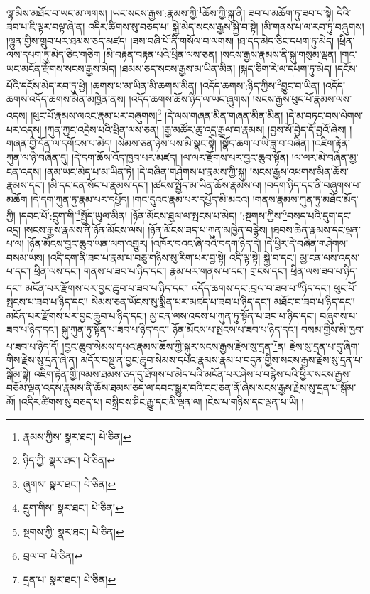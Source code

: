 ལྷ་མིས་མཐོང་བ་ཡང་མ་ལགས། །ཡང་སངས་རྒྱས་:རྣམས་ཀྱི་\footnote{རྣམས་ཀྱིས་  སྣར་ཐང་།  པེ་ཅིན། }ཆོས་ཀྱི་སྐུ་ནི། ཟབ་པ་མཆོག་ཏུ་ཟབ་པ་སྟེ། དེའི་ཟབ་པ་ཇི་ལྟར་བལྟ་ཞེ་ན། འདིར་ཚིགས་སུ་བཅད་པ། སྐྱེ་མེད་སངས་རྒྱས་སྐྱེ་བ་སྟེ། །མི་གནས་པ་ལ་རབ་ཏུ་བཞུགས། །ལྷུན་གྱིས་གྲུབ་པར་ཐམས་ཅད་མཛད། །ཟས་བཞི་པོ་ནི་གསོལ་བ་ལགས། །ཐ་དད་མེད་ཅིང་དཔག་ཏུ་མེད། །ཕྲིན་ལས་དཔག་ཏུ་མེད་ཅིང་གཅིག །མི་བརྟན་བརྟན་པའི་ཕྲིན་ལས་ཅན། །སངས་རྒྱས་རྣམས་ནི་སྐུ་གསུམ་ལྡན། །གང་ཡང་མངོན་རྫོགས་སངས་རྒྱས་མེད། །ཐམས་ཅད་སངས་རྒྱས་མ་ཡིན་མིན། །སྐད་ཅིག་རེ་ལ་དཔག་ཏུ་མེད། །དངོས་པོའི་དངོས་མེད་རབ་ཏུ་ཕྱེ། །ཆགས་པ་མ་ཡིན་མི་ཆགས་མིན། །འདོད་ཆགས་:ཉིད་ཀྱིས་\footnote{ཉིད་ཀྱི་  སྣར་ཐང་།  པེ་ཅིན། }བྱུང་བ་ཡིན། །འདོད་ཆགས་འདོད་ཆགས་མིན་མཁྱེན་ནས། །འདོད་ཆགས་ཆོས་ཉིད་ལ་ཡང་ཞུགས། །སངས་རྒྱས་ཕུང་པོ་རྣམས་ལས་འདས། །ཕུང་པོ་རྣམས་ལའང་རྣམ་པར་བཞུགས།\footnote{ཞུགས།  སྣར་ཐང་།  པེ་ཅིན། } །དེ་ལས་གཞན་མིན་གཞན་མིན་མིན། །དེ་མ་བཏང་བས་ལེགས་པར་འདས། །ཀུན་ཀྱང་འདྲེས་པའི་ཕྲིན་ལས་ཅན། །རྒྱ་མཚོར་ཆུ་འདྲ་རྒྱལ་བ་རྣམས། །བྱས་སོ་བྱེད་དོ་བྱའོ་ཞེས། །གཞན་གྱི་དོན་ལ་དགོངས་པ་མེད། །སེམས་ཅན་ཉེས་པས་མི་སྣང་སྟེ། །སྣོད་ཆག་པ་ཡི་ཟླ་བ་བཞིན། །འཇིག་རྟེན་ཀུན་ལ་ཉི་བཞིན་དུ། །དེ་དག་ཆོས་འོད་ཁྱབ་པར་མཛད། །ལ་ལར་རྫོགས་པར་བྱང་ཆུབ་སྟོན། །ལ་ལར་མེ་བཞིན་མྱ་ངན་འདས། །ནམ་ཡང་མེད་པ་མ་ཡིན་ཏེ། །དེ་བཞིན་གཤེགས་པ་རྣམས་ཀྱི་སྐུ། །སངས་རྒྱས་འཕགས་མིན་ཆོས་རྣམས་དང་། །མི་དང་ངན་སོང་པ་རྣམས་དང་། །ཚངས་སྤྱོད་མ་ཡིན་ཆོས་རྣམས་ལ། །བདག་ཉིད་དང་ནི་བཞུགས་པ་མཆོག །དེ་དག་ཀུན་ཏུ་རྣམ་པར་དཔྱོད། །གང་དུའང་རྣམ་པར་དཔྱོད་མི་མངའ། །གནས་རྣམས་ཀུན་ཏུ་མཐོང་མོད་ཀྱི། །དབང་པོ་:དྲུག་གི་\footnote{དྲུག་གིས་  སྣར་ཐང་།  པེ་ཅིན། }སྤྱོད་ཡུལ་མིན། །ཉོན་མོངས་ཐུལ་ལ་སྤངས་པ་མེད། །:སྔགས་ཀྱིས་\footnote{སྔགས་ཀྱི་  སྣར་ཐང་།  པེ་ཅིན། }བསད་པའི་དུག་དང་འདྲ། །སངས་རྒྱས་རྣམས་ནི་ཉོན་མོངས་ལས། །ཉོན་མོངས་ཟད་པ་ཀུན་མཁྱེན་བརྙེས། །ཐབས་ཆེན་རྣམས་དང་ལྡན་པ་ལ། །ཉོན་མོངས་བྱང་ཆུབ་ཡན་ལག་འགྱུར། །འཁོར་བའང་ཞི་བའི་བདག་ཉིད་དེ། །དེ་ཕྱིར་དེ་བཞིན་གཤེགས་བསམ་ཡས། །འདི་དག་ནི་ཟབ་པ་རྣམ་པ་བཅུ་གཉིས་སུ་རིག་པར་བྱ་སྟེ། འདི་ལྟ་སྟེ། སྐྱེ་བ་དང་། མྱ་ངན་ལས་འདས་པ་དང་། ཕྲིན་ལས་དང་། གནས་པ་ཟབ་པ་ཉིད་དང་། རྣམ་པར་གནས་པ་དང་། གྲངས་དང་། ཕྲིན་ལས་ཟབ་པ་ཉིད་དང་། མངོན་པར་རྫོགས་པར་བྱང་ཆུབ་པ་ཟབ་པ་ཉིད་དང་། འདོད་ཆགས་དང་:བྲལ་བ་ཟབ་པ་\footnote{བྲལ་བ་  པེ་ཅིན། }ཉིད་དང་། ཕུང་པོ་སྤངས་པ་ཟབ་པ་ཉིད་དང་། སེམས་ཅན་ཡོངས་སུ་སྨིན་པར་མཛད་པ་ཟབ་པ་ཉིད་དང་། མཐོང་བ་ཟབ་པ་ཉིད་དང་། མངོན་པར་རྫོགས་པར་བྱང་ཆུབ་པ་ཉིད་དང་། མྱ་ངན་ལས་འདས་པ་ཀུན་ཏུ་སྟོན་པ་ཟབ་པ་ཉིད་དང་། བཞུགས་པ་ཟབ་པ་ཉིད་དང་། སྐུ་ཀུན་ཏུ་སྟོན་པ་ཟབ་པ་ཉིད་དང་། ཉོན་མོངས་པ་སྤངས་པ་ཟབ་པ་ཉིད་དང་། བསམ་གྱིས་མི་ཁྱབ་པ་ཟབ་པ་ཉིད་དོ། །བྱང་ཆུབ་སེམས་དཔའ་རྣམས་ཆོས་ཀྱི་སྐུར་སངས་རྒྱས་རྗེས་སུ་དྲན་\footnote{དྲན་པ་  སྣར་ཐང་།  པེ་ཅིན། }ན། རྗེས་སུ་དྲན་པ་དུ་ཞིག་གིས་རྗེས་སུ་དྲན་ཞེ་ན། མདོར་བསྡུ་ན་བྱང་ཆུབ་སེམས་དཔའ་རྣམས་རྣམ་པ་བདུན་གྱིས་སངས་རྒྱས་རྗེས་སུ་དྲན་པ་སྒོམ་སྟེ། འཇིག་རྟེན་གྱི་ཁམས་ཐམས་ཅད་དུ་ཐོགས་པ་མེད་པའི་མངོན་པར་ཤེས་པ་བརྙེས་པའི་ཕྱིར་སངས་རྒྱས་བཅོམ་ལྡན་འདས་རྣམས་ནི་ཆོས་ཐམས་ཅད་ལ་དབང་སྒྱུར་བའི་ངང་ཅན་ནོ་ཞེས་སངས་རྒྱས་རྗེས་སུ་དྲན་པ་སྒོམ་མོ། །འདིར་ཚིགས་སུ་བཅད་པ། བསྒྲིབས་ཤིང་རྒྱུ་དང་མི་ལྡན་ལ། །ངེས་པ་གཉིས་དང་ལྡན་པ་ཡི། །
